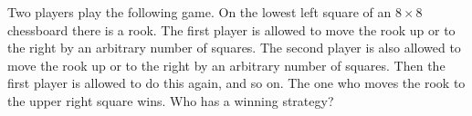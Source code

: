 Two players play the following game. On the lowest left square of an $8\times  8$ chessboard there is a rook. The first player is allowed to move the rook up or to the right by an arbitrary number of squares. The second player is also allowed to move the rook up or to the right by an arbitrary number of squares. Then the first player is allowed to do this again, and so on. The one who moves the rook to the upper right square wins. Who has a winning strategy?
